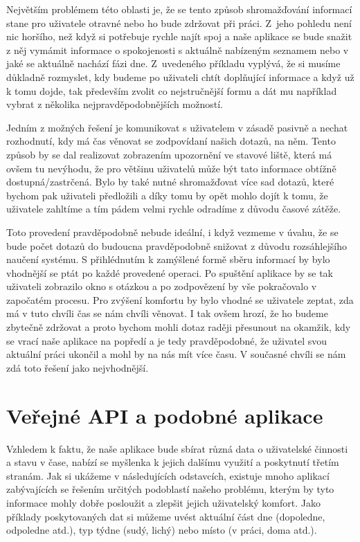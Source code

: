 \documentclass[thesis=M,czech]{FITthesis}[2012/06/26]
\begin{document}
Největším problémem této oblasti je, že se tento způsob shromažďování informací stane pro uživatele otravné nebo ho bude zdržovat při práci. Z~jeho pohledu není nic horšího, než když si potřebuje rychle najít spoj a naše aplikace se bude snažit z něj vymámit informace o spokojenosti s aktuálně nabízeným seznamem nebo v jaké se aktuálně nachází fázi dne. Z~uvedeného příkladu vyplývá, že si musíme důkladně rozmyslet, kdy budeme po uživateli chtít doplňující informace a když už k tomu dojde, tak především zvolit co nejstručnější formu a dát mu například vybrat z několika nejpravděpodobnějších možností.

Jedním z možných řešení je komunikovat s uživatelem v zásadě pasivně a nechat rozhodnutí, kdy má čas věnovat se zodpovídaní našich dotazů, na něm. Tento způsob by se dal realizovat zobrazením upozornění ve stavové liště, která má ovšem tu nevýhodu, že pro většinu uživatelů může být tato informace obtížně dostupná/zastrčená. Bylo by také nutné shromažďovat více sad dotazů, které bychom pak uživateli předložili a díky tomu by opět mohlo dojít k tomu, že uživatele zahltíme a tím pádem velmi rychle odradíme z důvodu časové zátěže.

Toto provedení pravděpodobně nebude ideální, i když vezmeme v úvahu, že se bude počet dotazů do budoucna pravděpodobně snižovat z důvodu rozsáhlejšího naučení systému. S přihlédnutím k zamýšlené formě sběru informací by bylo vhodnější se ptát po každé provedené operaci. Po spuštění aplikace by se tak uživateli zobrazilo okno s otázkou a po zodpovězení by vše pokračovalo v započatém procesu. Pro zvýšení komfortu by bylo vhodné se uživatele zeptat, zda má v tuto chvíli čas se nám chvíli věnovat. I tak ovšem hrozí, že ho budeme zbytečně zdržovat a proto bychom mohli dotaz raději přesunout na okamžik, kdy se vrací naše aplikace na popředí a je tedy pravděpodobné, že uživatel svou aktuální práci ukončil a mohl by na nás mít více času. V současné chvíli se nám zdá toto řešení jako nejvhodnější.

\section{Veřejné API a podobné aplikace}\label{api}
Vzhledem k faktu, že naše aplikace bude sbírat různá data o uživatelské činnosti a stavu v čase, nabízí se myšlenka k jejich dalšímu využití a poskytnutí třetím stranám. Jak si ukážeme v následujících odstavcích, existuje mnoho aplikací zabývajících se řešením určitých podoblastí našeho problému, kterým by tyto informace mohly dobře posloužit a zlepšit jejich uživatelský komfort. Jako příklady poskytovaných dat si můžeme uvést aktuální část dne (dopoledne, odpoledne atd.), typ týdne (sudý, lichý) nebo místo (v práci, doma atd.).
\end{document}
